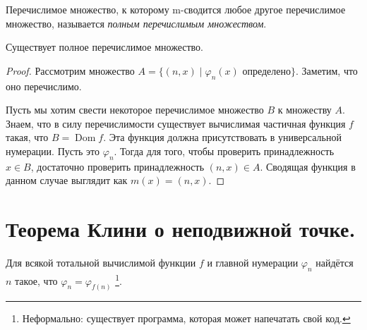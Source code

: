 \documentclass{article}
\begin{document}
    \begin{definition}
        Перечислимое множество, к которому m-сводится любое другое перечислимое множество, называется
        \textit{полным перечислимым множеством}.
    \end{definition}
    \begin{theorem}
        Существует полное перечислимое множество.
    \end{theorem}
    \begin{proof}
        Рассмотрим множество \(A = \{(n, x) \mid \varphi_n(x) \text{ определено}\}\). Заметим, что оно
        перечислимо.

        Пусть мы хотим свести некоторое перечислимое множество \(B\) к множеству \(A\). Знаем, что
        в силу перечислимости существует вычислимая частичная функция \(f\) такая, что \(B
        = \operatorname{Dom} f\). Эта функция должна присутствовать в универсальной нумерации. Пусть
        это \(\varphi_n\). Тогда для того, чтобы проверить принадлежность \(x \in B\), достаточно проверить
        принадлежность \((n, x) \in A\). Сводящая функция в данном случае выглядит как \(m(x) = (n,
        x)\).
    \end{proof}

    \section{Теорема Клини о неподвижной точке.}

    \begin{theorem}
        Для всякой тотальной вычислимой функции \(f\) и главной нумерации \(\varphi_n\) найдётся \(n\)
        такое, что \(\varphi_n = \varphi_{f(n)}\) \footnote{Неформально: существует программа, которая
        может напечатать свой код.}.
    \end{theorem}
\end{document}
